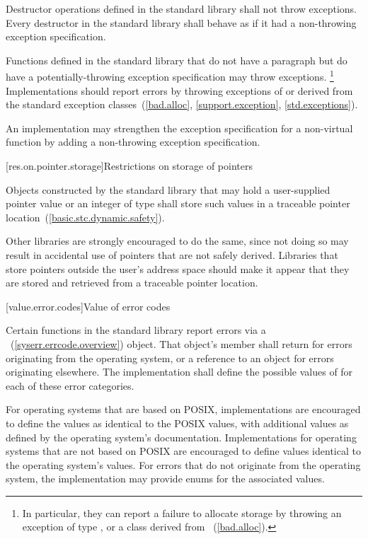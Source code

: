 \pnum
Destructor operations defined in the \Cpp standard library
shall not throw exceptions.
Every destructor in the \Cpp standard library shall behave as if it had a
non-throwing exception specification.

\pnum
Functions defined in the
\Cpp standard library
%
that do not have a
paragraph
but do have a potentially-throwing
exception specification
may throw  exceptions.%
\footnote{In particular, they
can report a failure to allocate storage by throwing an exception of type
,
or a class derived from
~(\ref{bad.alloc}).}
Implementations should
report errors by throwing exceptions of or derived
from the standard exception classes~(\ref{bad.alloc},
\ref{support.exception}, \ref{std.exceptions}).

\pnum
An implementation may strengthen the
exception specification
for a non-virtual function
by adding a non-throwing exception specification.

[res.on.pointer.storage]{Restrictions on storage of pointers}

\pnum
{}%
%
Objects constructed by the standard library that may hold a user-supplied pointer value
or an integer of type  shall store such values in a traceable
pointer location~(\ref{basic.stc.dynamic.safety}). \begin{note} Other libraries are
strongly encouraged to do the same, since not doing so may result in accidental use of
pointers that are not safely derived. Libraries that store pointers outside the user's
address space should make it appear that they are stored and retrieved from a traceable
pointer location. \end{note}

[value.error.codes]{Value of error codes}

\pnum
Certain functions in the \Cpp standard library report errors via a
~(\ref{syserr.errcode.overview}) object. That object's
 member shall return  for
errors originating from the operating system, or a reference to an
  object for errors originating elsewhere.
The implementation shall define the possible values of  for each of these
error categories. \begin{example} For operating systems that are based on POSIX,
implementations are encouraged to define the  values as
identical to the POSIX  values, with additional values as defined by the
operating system's documentation. Implementations for operating systems that are not
based on POSIX are encouraged to define values identical to the operating system's
values. For errors that do not originate from the operating system, the implementation
may provide enums for the associated values. \end{example}

